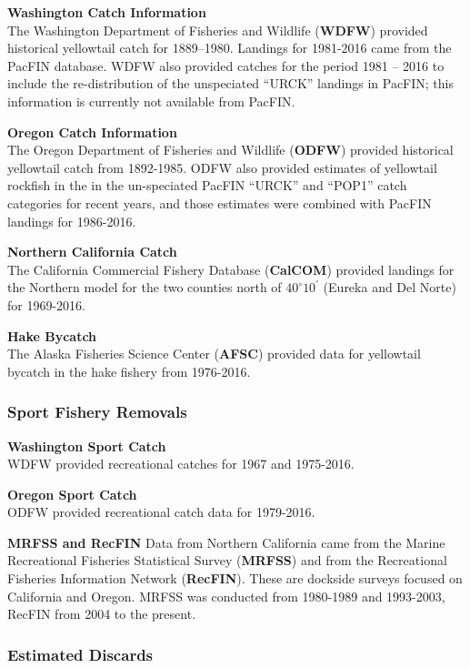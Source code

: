 \documentclass[12pt,]{article}
\begin{document}
\textbf{Washington Catch Information}\\
The Washington Department of Fisheries and Wildlife (\textbf{WDFW})
provided historical yellowtail catch for 1889--1980. Landings for
1981-2016 came from the PacFIN database. WDFW also provided catches for
the period 1981 -- 2016 to include the re-distribution of the
unspeciated ``URCK'' landings in PacFIN; this information is currently
not available from PacFIN.

\textbf{Oregon Catch Information}\\
The Oregon Department of Fisheries and Wildlife (\textbf{ODFW}) provided
historical yellowtail catch from 1892-1985. ODFW also provided estimates
of yellowtail rockfish in the in the un-speciated PacFIN ``URCK'' and
``POP1'' catch categories for recent years, and those estimates were
combined with PacFIN landings for 1986-2016.

\textbf{Northern California Catch}\\
The California Commercial Fishery Database (\textbf{CalCOM}) provided
landings for the Northern model for the two counties north of
\(40^\circ 10^\prime\) (Eureka and Del Norte) for 1969-2016.

\textbf{Hake Bycatch}\\
The Alaska Fisheries Science Center (\textbf{AFSC}) provided data for
yellowtail bycatch in the hake fishery from 1976-2016.

\subsubsection{Sport Fishery Removals}\label{sport-fishery-removals}

\textbf{Washington Sport Catch}\\
WDFW provided recreational catches for 1967 and 1975-2016.

\textbf{Oregon Sport Catch}\\
ODFW provided recreational catch data for 1979-2016.

\textbf{MRFSS and RecFIN} Data from Northern California came from the
Marine Recreational Fisheries Statistical Survey (\textbf{MRFSS}) and
from the Recreational Fisheries Information Network (\textbf{RecFIN}).
These are dockside surveys focused on California and Oregon. MRFSS was
conducted from 1980-1989 and 1993-2003, RecFIN from 2004 to the present.

\subsubsection{Estimated Discards}\label{estimated-discards}
\end{document}
